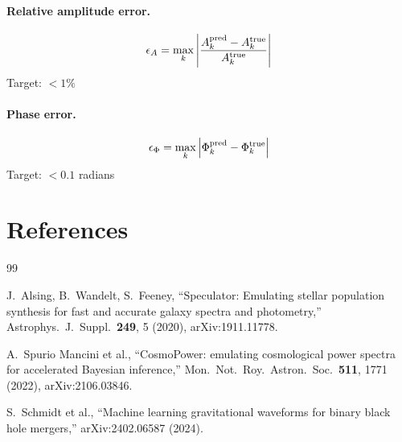 \documentclass[11pt,a4paper]{article}
\begin{document}
\paragraph{Relative amplitude error.}
\begin{equation}
    \epsilon_A = \max_k \left| \frac{A_k^{\rm pred} - A_k^{\rm true}}{A_k^{\rm true}} \right|
\end{equation}
Target: $< 1\%$

\paragraph{Phase error.}
\begin{equation}
    \epsilon_\Phi = \max_k \left| \Phi_k^{\rm pred} - \Phi_k^{\rm true} \right|
\end{equation}
Target: $< 0.1$ radians

\section*{References}

\begin{thebibliography}{99}

J.~Alsing, B.~Wandelt, S.~Feeney,
``Speculator: Emulating stellar population synthesis for fast and accurate galaxy spectra and photometry,''
Astrophys.\ J.\ Suppl.\ \textbf{249}, 5 (2020), arXiv:1911.11778.

A.~Spurio Mancini et al.,
``CosmoPower: emulating cosmological power spectra for accelerated Bayesian inference,''
Mon.\ Not.\ Roy.\ Astron.\ Soc.\ \textbf{511}, 1771 (2022), arXiv:2106.03846.

S.~Schmidt et al.,
``Machine learning gravitational waveforms for binary black hole mergers,''
arXiv:2402.06587 (2024).

\end{thebibliography}
\end{document}
